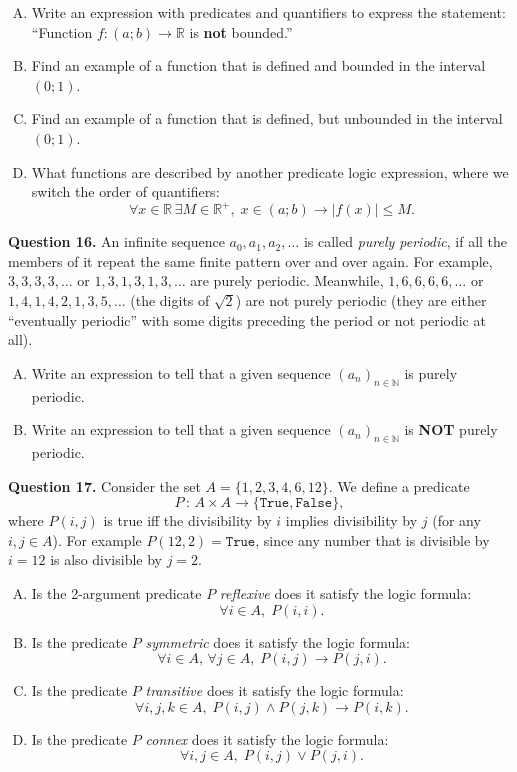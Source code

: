 \documentclass[jou]{apa6}
\begin{document}
\begin{enumerate}[(A)]
\item Write an expression with predicates and quantifiers to express the statement: 
``Function $f:(a;b) \rightarrow \mathbb{R}$ is {\bf not} bounded.''
\item Find an example of a function that is defined and bounded in the interval $(0;1)$. 
\item Find an example of a function that is defined, but unbounded in the interval $(0;1)$. 
\item What functions are described by another predicate logic expression, where we switch the order of quantifiers:
$$\forall x \in \mathbb{R}\,\exists M \in \mathbb{R}^{+},\;x \in (a;b) \rightarrow |f(x)| \leq M.$$
\end{enumerate}


\vspace{6pt}
{\bf Question 16.} An infinite sequence $a_0,a_1,a_2,\ldots$ is called {\em purely periodic}, if 
all the members of it repeat the same finite pattern over and over again. 
For example, $3,3,3,3,\ldots$ or $1,3,1,3,1,3,\ldots$ are purely periodic. 
Meanwhile, 
$1,6,6,6,6,\ldots$ or $1,4,1,4,2,1,3,5,\ldots$ (the digits of $\sqrt{2}$) 
are not purely periodic (they are either ``eventually periodic'' with some digits preceding the period 
or not periodic at all). 
\begin{enumerate}[(A)]
\item Write an expression to tell that a given sequence $(a_n)_{n \in \mathbb{N}}$ 
is purely periodic. 
\item Write an expression to tell that a given sequence $(a_n)_{n \in \mathbb{N}}$ 
is {\bf NOT} purely periodic. 
\end{enumerate}


\vspace{6pt}
{\bf Question 17.} 
Consider the set $A = \{ 1,2,3,4,6,12 \}$. We define a
predicate 
$$P \,:\, A \times A \rightarrow \{ \mathtt{True}, \mathtt{False} \},$$
where $P(i,j)$ is true iff the divisibility by $i$ implies 
divisibility by $j$ (for any $i,j \in A$). 
For example $P(12,2) = \mathtt{True}$, since any number 
that is divisible by $i = 12$ is also divisible by $j=2$. 

\begin{enumerate}[(A)]
\item Is the 2-argument predicate $P$ {\em reflexive} \textendash{}
does it satisfy the logic formula:
$$\forall i \in A,\;P(i,i).$$
\item Is the predicate $P$ {\em symmetric} \textendash{}
does it satisfy the logic formula:
$$\forall i \in A,\,\forall j \in A,\;P(i,j) \rightarrow P(j,i).$$
\item Is the predicate $P$ {\em transitive} \textendash{}
does it satisfy the logic formula:
$$\forall i,j,k \in A,\;P(i,j) \wedge P(j,k) \rightarrow P(i,k).$$
\item Is the predicate $P$ {\em connex} \textendash{}
does it satisfy the logic formula:
$$\forall i,j \in A,\;P(i,j) \vee P(j,i).$$
\end{enumerate}
\end{document}
